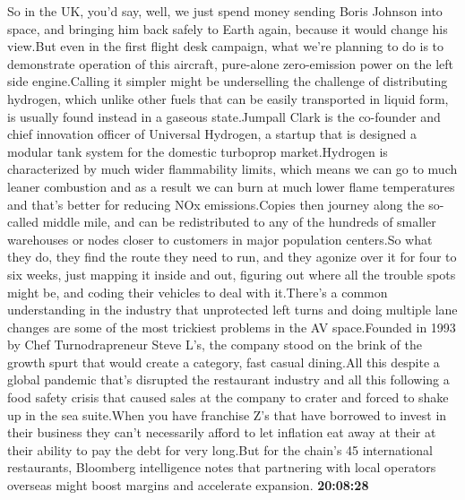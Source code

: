 \documentclass{article}%
\begin{document}
So in the UK, you'd say, well, we just spend money sending Boris Johnson into space, and bringing him back safely to Earth again, because it would change his view.But even in the first flight desk campaign, what we're planning to do is to demonstrate operation of this aircraft, pure{-}alone zero{-}emission power on the left side engine.Calling it simpler might be underselling the challenge of distributing hydrogen, which unlike other fuels that can be easily transported in liquid form, is usually found instead in a gaseous state.Jumpall Clark is the co{-}founder and chief innovation officer of Universal Hydrogen, a startup that is designed a modular tank system for the domestic turboprop market.Hydrogen is characterized by much wider flammability limits, which means we can go to much leaner combustion and as a result we can burn at much lower flame temperatures and that's better for reducing NOx emissions.Copies then journey along the so{-}called middle mile, and can be redistributed to any of the hundreds of smaller warehouses or nodes closer to customers in major population centers.So what they do, they find the route they need to run, and they agonize over it for four to six weeks, just mapping it inside and out, figuring out where all the trouble spots might be, and coding their vehicles to deal with it.There's a common understanding in the industry that unprotected left turns and doing multiple lane changes are some of the most trickiest problems in the AV space.Founded in 1993 by Chef Turnodrapreneur Steve L's, the company stood on the brink of the growth spurt that would create a category, fast casual dining.All this despite a global pandemic that's disrupted the restaurant industry and all this following a food safety crisis that caused sales at the company to crater and forced to shake up in the sea suite.When you have franchise Z's that have borrowed to invest in their business they can't necessarily afford to let inflation eat away at their at their ability to pay the debt for very long.But for the chain's 45 international restaurants, Bloomberg intelligence notes that partnering with local operators overseas might boost margins and accelerate expansion.%
\textbf{20:08:28}%
\end{document}

